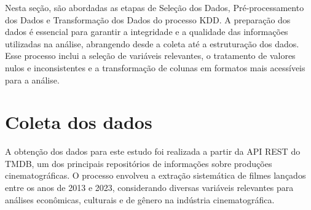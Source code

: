 Nesta seção, são abordadas as etapas de Seleção dos Dados, Pré-processamento dos Dados e Transformação dos Dados do processo \acrshort{KDD}. A preparação dos dados é essencial para garantir a integridade e a qualidade das informações utilizadas na análise, abrangendo desde a coleta até a estruturação dos dados. Esse processo inclui a seleção de variáveis relevantes, o tratamento de valores nulos e inconsistentes e a transformação de colunas em formatos mais acessíveis para a análise.











\section{Coleta dos dados}\label{coleta-dados}
A obtenção dos dados para este estudo foi realizada a partir da \acrshort{API} \acrshort{REST} do \acrshort{TMDB}, um dos principais repositórios de informações sobre produções cinematográficas. O processo envolveu a extração sistemática de filmes lançados entre os anos de 2013 e 2023, considerando diversas variáveis relevantes para análises econômicas, culturais e de gênero na indústria cinematográfica.

